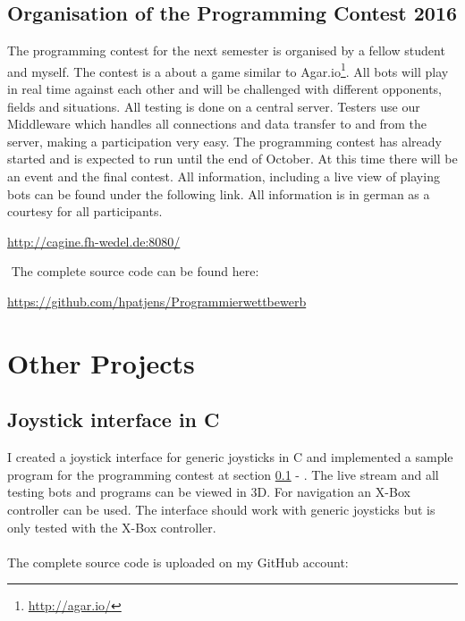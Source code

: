 \documentclass[a4paper, 12pt]{article}
\begin{document}
\subsection{Organisation of the Programming Contest 2016}\label{agar}

The programming contest for the next semester is organised by a fellow student and myself. 
The contest is a about a game similar to Agar.io\footnote{\url{http://agar.io/}}. All bots will play in real time against each other and will be challenged with different opponents, fields and situations.
\newline
All testing is done on a central server. Testers use our Middleware which handles all connections and data transfer to and from the server, making a participation very easy.
\newline
The programming contest has already started and is expected to run until the end of October. At this time there will be an event and the final contest.
\newline
All information, including a live view of playing bots can be found under the following link. All information is in german as a courtesy for all participants.

\begin{center}
	\url{http://cagine.fh-wedel.de:8080/}
\end{center} $ $
\newline
The complete source code can be found here:

\begin{center}
	\url{https://github.com/hpatjens/Programmierwettbewerb}
\end{center}


\section{Other Projects}

\subsection{Joystick interface in C}

I created a joystick interface for generic joysticks in C and implemented a sample program for the programming contest at section \ref{agar} - \glqq{}\grqq.
\newline
The live stream and all testing bots and programs can be viewed in 3D. For navigation an X-Box controller can be used. The interface should work with generic joysticks but is only tested with the X-Box controller.
\\
\\
The complete source code is uploaded on my GitHub account:
\end{document}
